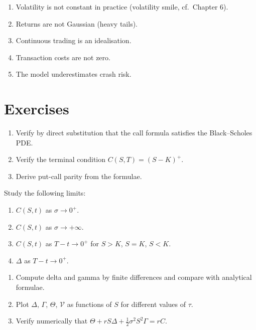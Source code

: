 \begin{warning}[title=\textbf{Known Limitations of Black--Scholes}]
\begin{enumerate}
    \item Volatility is not constant in practice
          (volatility smile, cf.\ Chapter 6).
    \item Returns are not Gaussian (heavy tails).
    \item Continuous trading is an idealisation.
    \item Transaction costs are not zero.
    \item The model underestimates crash risk.
\end{enumerate}
\end{warning}

\section{Exercises}

\begin{exercise}
\begin{enumerate}
    \item Verify by direct substitution that the call formula satisfies
          the Black--Scholes PDE.
    \item Verify the terminal condition $C(S,T) = (S-K)^+$.
    \item Derive put-call parity from the formulae.
\end{enumerate}
\end{exercise}

\begin{exercise}
Study the following limits:
\begin{enumerate}
    \item $C(S,t)$ as $\sigma \to 0^+$.
    \item $C(S,t)$ as $\sigma \to +\infty$.
    \item $C(S,t)$ as $T - t \to 0^+$ for $S > K$, $S = K$, $S < K$.
    \item $\Delta$ as $T - t \to 0^+$.
\end{enumerate}
\end{exercise}

\begin{exercise}
\begin{enumerate}
    \item Compute delta and gamma by finite differences and compare with
          analytical formulae.
    \item Plot $\Delta$, $\Gamma$, $\Theta$, $\mathcal{V}$ as functions
          of $S$ for different values of $\tau$.
    \item Verify numerically that $\Theta + rS\Delta +
          \frac{1}{2}\sigma^2 S^2\Gamma = rC$.
\end{enumerate}
\end{exercise}

